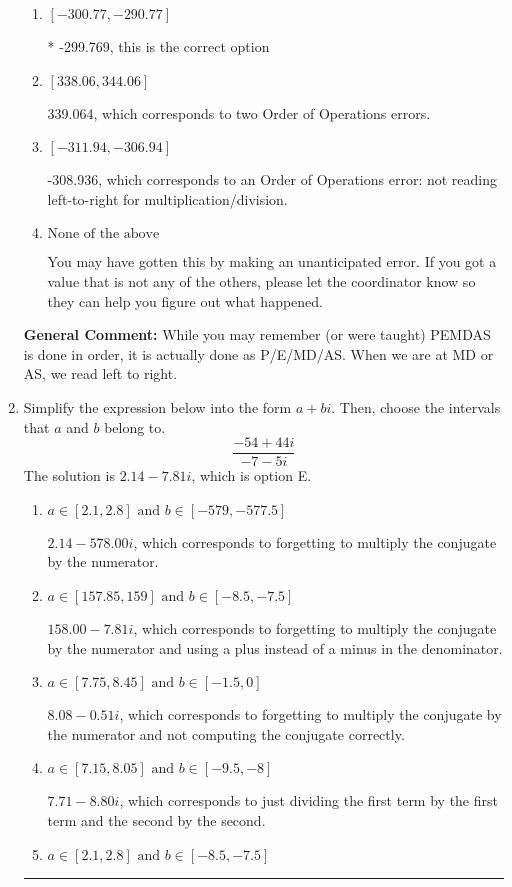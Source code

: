 \documentclass{extbook}[14pt]
\newcommand{\litem}[1]{\item #1

\rule{\textwidth}{0.4pt}}
\begin{document}
\begin{enumerate}
{\begin{enumerate}[label=\Alph*.]
 348.231, which corresponds to an Order of Operations error: multiplying by negative before squaring. For example: $(-3)^2 \neq -3^2$
\item \( [-300.77, -290.77] \)

* -299.769, this is the correct option
\item \( [338.06, 344.06] \)

 339.064, which corresponds to two Order of Operations errors.
\item \( [-311.94, -306.94] \)

 -308.936, which corresponds to an Order of Operations error: not reading left-to-right for multiplication/division.
\item \( \text{None of the above} \)

 You may have gotten this by making an unanticipated error. If you got a value that is not any of the others, please let the coordinator know so they can help you figure out what happened.
\end{enumerate}

\textbf{General Comment:} While you may remember (or were taught) PEMDAS is done in order, it is actually done as P/E/MD/AS. When we are at MD or AS, we read left to right.
}
\litem{
Simplify the expression below into the form $a+bi$. Then, choose the intervals that $a$ and $b$ belong to.
\[ \frac{-54 + 44 i}{-7 - 5 i} \]The solution is \( 2.14  - 7.81 i \), which is option E.\begin{enumerate}[label=\Alph*.]
\item \( a \in [2.1, 2.8] \text{ and } b \in [-579, -577.5] \)

 $2.14  - 578.00 i$, which corresponds to forgetting to multiply the conjugate by the numerator.
\item \( a \in [157.85, 159] \text{ and } b \in [-8.5, -7.5] \)

 $158.00  - 7.81 i$, which corresponds to forgetting to multiply the conjugate by the numerator and using a plus instead of a minus in the denominator.
\item \( a \in [7.75, 8.45] \text{ and } b \in [-1.5, 0] \)

 $8.08  - 0.51 i$, which corresponds to forgetting to multiply the conjugate by the numerator and not computing the conjugate correctly.
\item \( a \in [7.15, 8.05] \text{ and } b \in [-9.5, -8] \)

 $7.71  - 8.80 i$, which corresponds to just dividing the first term by the first term and the second by the second.
\item \( a \in [2.1, 2.8] \text{ and } b \in [-8.5, -7.5] \)


\end{enumerate}}
\end{enumerate}
\end{document}
